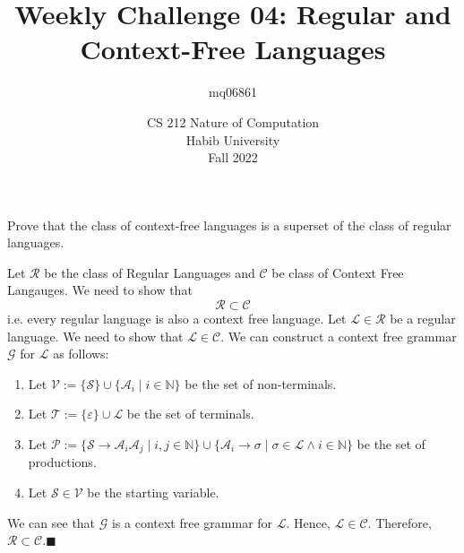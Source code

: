 \documentclass[a4paper]{exam}
\title{Weekly Challenge 04: Regular and Context-Free Languages}
\author{mq06861} %
\date{CS 212 Nature of Computation\\Habib University\\Fall 2022}
\begin{document}
\maketitle
\begin{questions}


	Prove that the class of context-free languages is a superset of the class of regular languages.

	\begin{solution}
		Let \(\mathcal{R}\) be the class of Regular Languages and \(\mathcal{C}\) be class of Context Free Langauges. We need to show that \[\mathcal{R}\subset\mathcal{C}\] i.e. every regular language is also a context free language. Let \(\mathcal{L}\in\mathcal{R}\) be a regular language. We need to show that \(\mathcal{L}\in\mathcal{C}\). We can construct a context free grammar \(\mathcal{G}\) for \(\mathcal{L}\) as follows:

		\begin{enumerate}
			\item Let \(\mathcal{V}:=\{\mathcal{S}\}\cup\{\mathcal{A}_i\mid i\in\mathbb{N}\}\) be the set of non-terminals.
			\item Let \(\mathcal{T}:=\{\varepsilon\}\cup\mathcal{L}\) be the set of terminals.
			\item Let \(\mathcal{P}:=\{\mathcal{S}\rightarrow \mathcal{A}_i\mathcal{A}_j\mid i,j\in\mathbb{N}\}\cup\{\mathcal{A}_i\rightarrow\sigma\mid\sigma\in\mathcal{L}\land i\in\mathbb{N}\}\) be the set of productions.
			\item Let \(\mathcal{S}\in\mathcal{V}\) be the starting variable.
		\end{enumerate}

		We can see that \(\mathcal{G}\) is a context free grammar for \(\mathcal{L}\). Hence, \(\mathcal{L}\in\mathcal{C}\). Therefore, \(\mathcal{R}\subset\mathcal{C}\).\hfill\(\blacksquare\)
	\end{solution}
\end{questions}
\end{document}
